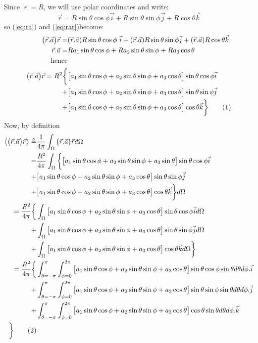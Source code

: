 \documentclass[]{article}
\newcommand\numberthis{\addtocounter{equation}{1}\tag{\theequation}}
\begin{document}
Since $|r|=R$, we will use polar coordinates and write:
$$\vec{r}=R\sin\theta\cos\phi\vec{i}+R\sin\theta\sin\phi\vec{j}+R\cos\theta\vec{k}$$
so (\ref{eq:ra}) and (\ref{eq:rar})become:
\begin{align*}
\big(\vec{r}.\vec{a}\big)\vec{r} =& (\vec{r}.\vec{a}) R \sin\theta\cos\phi\ \vec{i} + (\vec{r}.\vec{a})R\sin\theta\sin\phi  \vec{j} + (\vec{r}.\vec{a}) R\cos\theta \vec{k}\\
\vec{r}.\vec{a} =& Ra_1\sin\theta\cos\phi + Ra_2\sin\theta\sin\phi + Ra_3 \cos\theta\\
\text{hence}&\\
\big(\vec{r}.\vec{a}\big)\vec{r} = R^2 \bigg\{& \big[a_1\sin\theta\cos\phi + a_2\sin\theta\sin\phi + a_3 \cos\theta\big] \sin\theta\cos\phi\vec{i}\\ +& \big[a_1\sin\theta\cos\phi + a_2\sin\theta\sin\phi + a_3 \cos\theta\big]\sin\theta\sin\phi \vec{j}\\
 +& \big[a_1\sin\theta\cos\phi + a_2\sin\theta\sin\phi + a_3 \cos\theta\big] \cos\theta \vec{k}\bigg\}\numberthis \label{eq:rar_expanded}
\end{align*}
Now, by definition
\begin{align*}
\left\langle \big(\vec{r}.\vec{a}\big)\vec{r} \right\rangle \triangleq& \frac{1}{4\pi}\int_{\Omega}\big(\vec{r}.\vec{a}\big)\vec{r} d\Omega \\
=&  \frac{ R^2}{4\pi}\int_{\Omega} \bigg\{ \big[a_1\sin\theta\cos\phi + a_2\sin\theta\sin\phi + a_3 \sin\theta\big] \sin\theta\cos\phi\vec{i}\\ +& \big[a_1\sin\theta\cos\phi + a_2\sin\theta\sin\phi + a_3 \cos\theta\big]\sin\theta\sin\phi \vec{j}\\
+& \big[a_1\sin\theta\cos\phi + a_2\sin\theta\sin\phi + a_3 \cos\theta\big] \cos\theta \vec{k}\bigg\}d\Omega\\
= \frac{ R^2}{4\pi} \bigg\{&\int_{\Omega}\big[a_1\sin\theta\cos\phi + a_2\sin\theta\sin\phi + a_3 \cos\theta\big] \sin\theta\cos\phi\vec{i}d\Omega\\ +& \int_{\Omega}\big[a_1\sin\theta\cos\phi + a_2\sin\theta\sin\phi + a_3 \cos\theta\big]\sin\theta\sin\phi \vec{j}d\Omega\\
+& \int_{\Omega}\big[a_1\sin\theta\cos\phi + a_2\sin\theta\sin\phi + a_3 \cos\theta\big] \cos\theta \vec{k} d\Omega\bigg\}\\
= \frac{ R^2}{4\pi} \bigg\{&\int_{\theta=-\pi}^{\pi}\int_{\phi=0}^{2\pi}\big[a_1\sin\theta\cos\phi + a_2\sin\theta\sin\phi + a_3 \cos\theta\big] \sin\theta\cos\phi\sin\theta d\theta d\phi.\vec{i}\\
 +& \int_{\theta=-\pi}^{\pi}\int_{\phi=0}^{2\pi}\big[a_1\sin\theta\cos\phi + a_2\sin\theta\sin\phi + a_3 \cos\theta\big]\sin\theta\sin\phi \sin\theta d\theta d\phi.\vec{j}\\
+& \int_{\theta=-\pi}^{\pi}\int_{\phi=0}^{2\pi}\big[a_1\sin\theta\cos\phi + a_2\sin\theta\sin\phi + a_3 \cos\theta\big] \cos\theta \sin\theta d\theta d\phi.\vec{k}\\ \bigg\} \numberthis \label{eq:big-int}
\end{align*}
\end{document}
